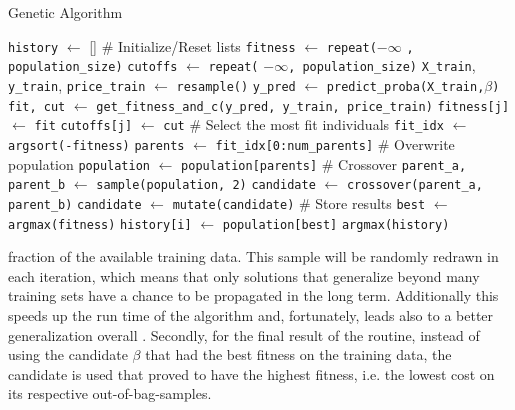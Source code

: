 \begin{algorithm}
\tiny
\caption{Genetic Algorithm}
\label{GA}
\begin{algorithmic}
\State \texttt{history} $\gets$ []
    \State \# Initialize/Reset lists
    \State \texttt{fitness} $\gets$ \texttt{repeat(}$-\infty$ \texttt{, population\_size)}
    \State \texttt{cutoffs} $\gets$ \texttt{repeat(} $-\infty$\texttt{, population\_size)}
        \State \texttt{X\_train}, \texttt{y\_train}, \texttt{price\_train} $\gets$ \texttt{resample()}
    \EndIf   
        \State \texttt{y\_pred} $\gets$ \texttt{predict\_proba(X\_train,}$\beta$\texttt{)}
        \State \texttt{fit, cut} $\gets$ \texttt{get\_fitness\_and\_c(y\_pred, y\_train, price\_train)}
        \State \texttt{fitness[j]} $\gets$ \texttt{fit}
        \State \texttt{cutoffs[j]} $\gets$ \texttt{cut}
    \EndFor
    \State \# Select the most fit individuals
    \State \texttt{fit\_idx} $\gets$ \texttt{argsort(-fitness)}
    \State \texttt{parents} $\gets$ \texttt{fit\_idx[0:num\_parents]}
    \State \# Overwrite population
    \State \texttt{population} $\gets$ \texttt{population[parents]}
    \State \# Crossover
        \State \texttt{parent\_a, parent\_b} $\gets$ \texttt{sample(population, 2)}
        \State \texttt{candidate} $\gets$ \texttt{crossover(parent\_a, parent\_b)}
            \State \texttt{candidate} $\gets$ \texttt{mutate(candidate)}
        \EndIf
    \EndWhile
    \State \# Store results
    \State \texttt{best} $\gets$ \texttt{argmax(fitness)}
    \State \texttt{history[i]} $\gets$ \texttt{population[best]}
\EndFor
\State \Return \texttt{argmax(history)}
\end{algorithmic}
\end{algorithm}

\noindent fraction of the available training data. This sample will be randomly redrawn in each iteration, which means that only solutions that generalize beyond many training sets have a chance to be propagated in the long term. Additionally this speeds up the run time of the algorithm and, fortunately, leads also to a better generalization overall \cite{garst}. Secondly, for the final result of the routine, instead of using the candidate $\beta$ that had the best fitness on the training data, the candidate is used that proved to have the highest fitness, i.e. the lowest cost on its respective out-of-bag-samples.

